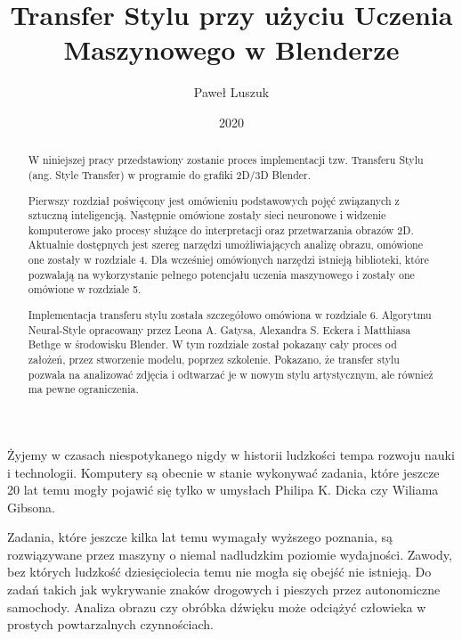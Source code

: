 \documentclass[brudnopis]{xmgr}
\author   {Paweł Luszuk}
\title    {Transfer Stylu przy użyciu Uczenia Maszynowego w Blenderze}
\date     {2020}
\begin{document}
\begin{abstract}

W niniejszej pracy przedstawiony zostanie proces implementacji tzw. Transferu Stylu (ang. Style Transfer) w programie do grafiki 2D/3D Blender.

Pierwszy rozdział poświęcony jest omówieniu podstawowych pojęć związanych z sztuczną inteligencją. Następnie omówione zostały sieci neuronowe i widzenie komputerowe jako procesy służące do interpretacji oraz przetwarzania obrazów 2D. Aktualnie dostępnych jest szereg narzędzi umożliwiających analizę obrazu, omówione one zostały w rozdziale 4. Dla wcześniej omówionych narzędzi istnieją biblioteki, które pozwalają na wykorzystanie pełnego potencjału uczenia maszynowego i zostały one omówione w rozdziale 5.

Implementacja transferu stylu została szczegółowo omówiona w rozdziale 6. Algorytmu Neural-Style opracowany przez Leona A. Gatysa, Alexandra S. Eckera i Matthiasa Bethge w środowisku Blender. W tym rozdziale został pokazany cały proces od założeń, przez stworzenie modelu, poprzez szkolenie. Pokazano, że transfer stylu pozwala na analizować zdjęcia i odtwarzać je w nowym stylu artystycznym, ale również ma pewne ograniczenia. 


\end{abstract}


\maketitle

\introduction

Żyjemy w czasach niespotykanego nigdy w historii ludzkości tempa rozwoju nauki i technologii. Komputery są obecnie w stanie wykonywać zadania, które jeszcze 20 lat temu mogły pojawić się tylko w umysłach Philipa K. Dicka czy Wiliama Gibsona.

Zadania, które jeszcze kilka lat temu wymagały wyższego poznania, są rozwiązywane przez maszyny o niemal nadludzkim poziomie wydajności. Zawody, bez których ludzkość dziesięciolecia temu nie mogła się obejść nie istnieją. Do zadań takich jak wykrywanie znaków drogowych i pieszych przez autonomiczne samochody. Analiza obrazu czy obróbka dźwięku może odciążyć człowieka w prostych powtarzalnych czynnościach.
\end{document}
